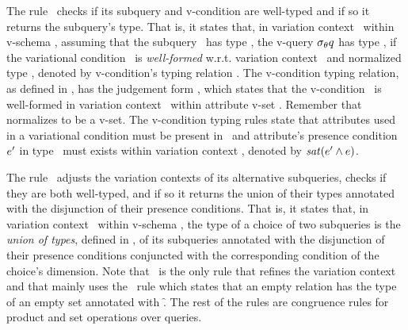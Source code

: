 

%
The rule \selE\ checks if its subquery and v-condition are well-typed
and if so it returns the subquery's type. 
%
That is, it states that, in variation context \vctx\ within v-schema \vSch, assuming 
that the subquery \vQ\ has type {\envInContext [\VVal \vctx] \vType}, 
the v-query $\sigma_{\vCond} \vQ$
has type {\envInContext [\VVal \vctx] \vType},
if the variational condition \vCond\ is \emph{well-formed} w.r.t.
 variation context \vctx\ and  normalized type {\pushIn {\envInContext [\VVal \vctx] \vType}}, 
denoted by v-condition's typing relation 
\envCondAnnot \vCond.
%
The v-condition typing relation, as defined in , has the 
judgement form \envCond \vCond, which states that the v-condition \vCond\
is well-formed in variation context \vctx\ within attribute v-set \vType.
Remember that  {\pushIn {\envInContext [\VVal \vctx] \vType}} normalizes 
{\envInContext [\VVal \vctx] \vType} to be a v-set.
The v-condition typing rules state that attributes used in a
variational condition must be present in \vType\ and 
attribute's presence condition \ensuremath {\VVal \dimMeta} 
in type \vType\ must exists within variation context \vctx,
denoted by \ensuremath{\sat {\VVal \dimMeta \wedge \vctx}}.

%
The rule \choiceE\ adjusts the variation contexts of its alternative 
subqueries, checks if they are both well-typed, and if so it returns
the union of their types annotated with the disjunction of their presence conditions. 
%
That is, it states that, in variation context \vctx\ within v-schema \vSch, the type of 
a choice of two subqueries is the \emph{union of types}, defined in 
\defref{vset-union}, of its subqueries annotated with the disjunction of their presence
conditions conjuncted with the corresponding condition of the choice's dimension.
%
Note that \choiceE\ is the only rule that refines the variation context and that 
mainly uses the \empRelE\ rule which states that an empty relation has the 
type of an empty set annotated with \f.
%
The rest of the rules are congruence rules for product and set operations over queries. 

